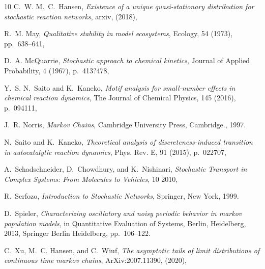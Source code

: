 \documentclass{amsart}
\theoremstyle{definition}
\theoremstyle{remark}
\theoremstyle{Conjecture/open problem}
\theoremstyle{assumption}
\theoremstyle{conjecture}
\numberwithin{equation}{section}
\begin{document}
\begin{thebibliography}{10}
{\sc C.~W. M.~C.~Hansen}, {\em Existence of a unique quasi-stationary
  distribution for stochastic reaction networks}, arxiv,  (2018),

{\sc R.~M. May}, {\em Qualitative stability in model ecosystems}, Ecology, 54
  (1973), pp.~638--641, %

{\sc D.~A. McQuarrie}, {\em Stochastic approach to chemical kinetics}, Journal
  of Applied Probability, 4 (1967), p.~413?478,

{\sc Y.~S. N.~Saito and K.~Kaneko}, {\em Motif analysis for small-number
  effects in chemical reaction dynamics}, The Journal of Chemical Physics, 145
  (2016), p.~094111, %

{\sc J.~R. Norris}, {\em {Markov Chains}}, Cambridge University Press,
  Cambridge., 1997.

{\sc N.~Saito and K.~Kaneko}, {\em Theoretical analysis of discreteness-induced
  transition in autocatalytic reaction dynamics}, Phys. Rev. E, 91 (2015),
  p.~022707, %

{\sc A.~Schadschneider, D.~Chowdhury, and K.~Nishinari}, {\em Stochastic
  Transport in Complex Systems: From Molecules to Vehicles}, 10 2010,

{\sc R.~Serfozo}, {\em {Introduction to Stochastic Networks}}, Springer, New
  York, 1999.

{\sc D.~Spieler}, {\em Characterizing oscillatory and noisy periodic behavior
  in markov population models}, in Quantitative Evaluation of Systems, Berlin,
  Heidelberg, 2013, Springer Berlin Heidelberg, pp.~106--122.

{\sc C.~Xu, M.~C. Hansen, and C.~Wiuf}, {\em The asymptotic tails of limit
  distributions of continuous time markov chains}, ArXiv:2007.11390,  (2020),

\end{thebibliography}

 
\end{document}
